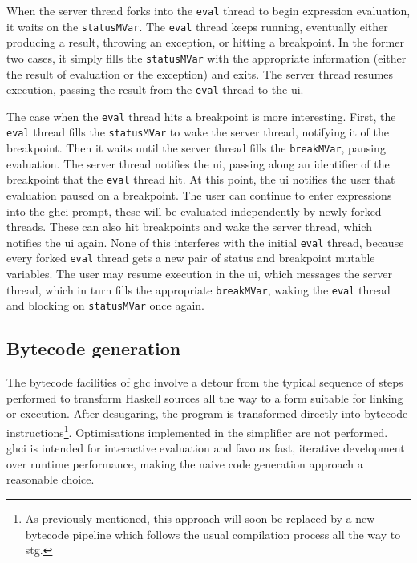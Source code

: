 \documentclass[thesis=B,english]{FITthesis}[2019/12/23]
\newcommand{\hsIdent}[1]{\texttt{#1}}
\begin{document}
When the server thread forks into the \texttt{eval} thread to begin expression
evaluation, it waits on the \hsIdent{statusMVar}. The \texttt{eval} thread
keeps running, eventually either producing a result, throwing an exception, or
hitting a breakpoint. In the former two cases, it simply fills the
\hsIdent{statusMVar} with the appropriate information (either the result of
evaluation or the exception) and exits. The server thread resumes execution,
passing the result from the \texttt{eval} thread to the \acrshort{ui}.

The case when the \texttt{eval} thread hits a breakpoint is more interesting.
First, the \texttt{eval} thread fills the \hsIdent{statusMVar} to wake the
server thread, notifying it of the breakpoint. Then it waits until the server
thread fills the \hsIdent{breakMVar}, pausing evaluation. The server thread
notifies the \acrshort{ui}, passing along an identifier of the breakpoint that
the \texttt{eval} thread hit. At this point, the \acrshort{ui} notifies the
user that evaluation paused on a breakpoint. The user can continue to enter
expressions into the \acrshort{ghci} prompt, these will be evaluated
independently by newly forked threads. These can also hit breakpoints and wake
the server thread, which notifies the \acrshort{ui} again. None of this
interferes with the initial \texttt{eval} thread, because every forked
\texttt{eval} thread gets a new pair of status and breakpoint mutable
variables. The user may resume execution in the \acrshort{ui}, which messages
the server thread, which in turn fills the appropriate \hsIdent{breakMVar},
waking the \texttt{eval} thread and blocking on \hsIdent{statusMVar} once
again.

\subsection*{Bytecode generation}
The bytecode facilities of \acrshort{ghc} involve a detour from the typical
sequence of steps performed to transform Haskell sources all the way to a form
suitable for linking or execution. After desugaring, the program is transformed
directly into bytecode instructions\footnote{
	As previously mentioned, this approach will soon be replaced by a new
	bytecode pipeline which follows the usual compilation process all the way
	to \acrshort{stg}\cite{mr-ghci-stg-unboxed}.
}. Optimisations implemented in the simplifier are not performed.
\acrshort{ghci} is intended for interactive evaluation and favours fast,
iterative development over runtime performance, making the naive code
generation approach a reasonable choice.
\end{document}
